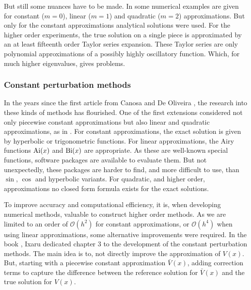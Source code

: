 But still some nuances have to be made. In \cite{pruess_estimating_1973} some numerical examples are given for constant ($m=0$), linear ($m=1$) and quadratic ($m=2$) approximations. But only for the constant approximations analytical solutions were used. For the higher order experiments, the true solution on a single piece is approximated by an at least fifteenth order Taylor series expansion. These Taylor series are only polynomial approximations of a possibly highly oscillatory function. Which, for much higher eigenvalues, gives problems.

\subsubsection{Constant perturbation methods}

In the years since the first article from Canosa and De Oliveira \cite{canosa_new_1970}, the research into these kinds of methods has flourished. One of the first extensions considered not only piecewise constant approximations but also linear and quadratic approximations, as in \cite{pruess_estimating_1973}. For constant approximations, the exact solution is given by hyperbolic or trigonometric functions. For linear approximations, the Airy functions $\operatorname{Ai}(x)$ and $\operatorname{Bi}(x)$ are appropriate. As these are well-known special functions, software packages are available to evaluate them. But not unexpectedly, these packages are harder to find, and more difficult to use, than $\sin$, $\cos$ and hyperbolic variants. For quadratic, and higher order, approximations no closed form formula exists for the exact solutions.

To improve accuracy and computational efficiency, it is, when developing numerical methods, valuable to construct higher order methods. As we are limited to an order of $\mathcal{O}(h^2)$ for constant approximations, or $\mathcal{O}(h^4)$ when using linear approximations, some alternative improvements were required. In the book \cite{ixaru_numerical_1984}, Ixaru dedicated chapter 3 to the development of the constant perturbation methods. The main idea is to, not directly improve the approximation of $V(x)$. But, starting with a piecewise constant approximation $\bar{V}(x)$, adding correction terms to capture the difference between the reference solution for $\bar{V}(x)$ and the true solution for $V(x)$.

